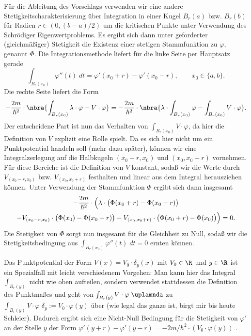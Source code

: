 \documentclass[../main.tex]{subfiles}
\begin{document}
            Für die Ableitung des Vorschlags verwenden wir eine andere Stetigkeitscharakterisierung über Integration in einer Kugel $B_{r}(a)$ bzw. $B_{r}(b)$ für Radien $r\in(0,(b-a)/2)$ um die kritischen Punkte unter Verwendung des Schrödiger Eigenwertproblems. Es ergibt sich dann unter geforderter (gleichmäßiger) Stetigkeit die Existenz einer stetigen Stammfunktion zu $\varphi$, genannt $\Phi$. Die Integrationsmethode liefert für die linke Seite per Hauptsatz gerade 
            \[
                \int_{B_r(x_0)}\varphi''(t)\;dt = \varphi'(x_0 + r) - \varphi'(x_0 - r),\qquad x_0\in\{a,b\}.
            \]
            Die rechte Seite liefert die Form
            \[
                -\frac{2m}{\hbar^2}\cdot\nbra{\int_{B_r(x_0)}\lambda\cdot\varphi - V\cdot\varphi} = -\frac{2m}{\hbar^2}\cdot\nbra{\lambda\cdot\int_{B_r(x_0)}\varphi - \int_{B_r(x_0)}V\cdot\varphi}.
            \]
            Der entscheidene Part ist nun das Verhalten von $\int_{B_r(x_0)}V\cdot \varphi$, da hier die Definition von $V$ explizit eine Rolle spielt. Da es sich hier nicht um ein Punktpotential handeln soll (mehr dazu später), können wir eine Integralzerlegung auf die Halbkugeln $(x_0-r,x_0)$ und $(x_0,x_0+r)$ vornehmen. Für diese Bereiche ist die Definition von $V$ konstant, sodaß wir die Werte durch $V_{(x_0-r,x_0)}$ bzw. $V_{(x_0,x_0+r)}$ festhalten und linear aus dem Integral herausziehen können. Unter Verwendung der Stammfunktion $\Phi$ ergibt sich dann insgesamt
            \begin{multline*}
                -\frac{2m}{\hbar^2}\cdot\Bigl(\lambda\cdot\bigl(\Phi(x_0 + r) - \Phi(x_0 - r)\bigr) \\
                - V_{(x_0-r,x_0)}\cdot\bigl(\Phi(x_0) - \Phi(x_0 - r)\bigr) - V_{(x_0,x_0+r)}\cdot\bigl(\Phi(x_0 + r) - \Phi(x_0)\bigr)\Bigr) = 0.
            \end{multline*}
            Die Stetigkeit von $\Phi$ sorgt nun insgesamt für die Gleichheit zu Null, sodaß wir die Stetigkeitsbedingung aus $\int_{B_r(x_0)}\varphi''(t)\;dt = 0$ ernten können. 

            Das Punktpotential der Form $V(x) = V_0\cdot\delta_{y}(x)$ mit $V_0\in\R$ und $y\in\R$ ist ein Spezialfall mit leicht verschiedenem Vorgehen: Man kann hier das Integral $\int_{B_r(y)}$ nicht wie oben aufteilen, sondern verwendet stattdessen die Definition des Punktmaßes und geht von $\int_{B_r(y)}V\cdot\varphi\;\uplamnda$ zu $\int_{B_r(y)}V\cdot\varphi\;\delta_y := V_0\cdot\varphi(y)$ über (wie legal das ganze ist, birgt mir bis heute Schleier). Dadurch ergibt sich eine Nicht-Null Bedingung für die Stetigkeit von $\varphi'$ an der Stelle $y$ der Form $\varphi'(y + r) - \varphi'(y - r) = -2m/\hbar^2\cdot (V_0\cdot\varphi(y))$ \cite{git:IK4T}. 
\end{document}
